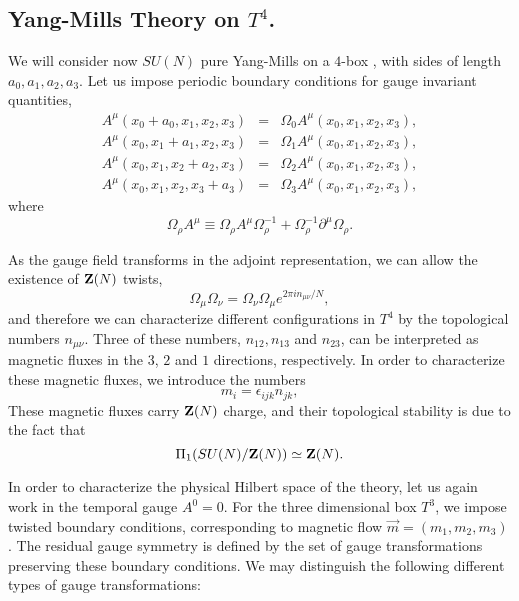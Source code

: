   
\subsection{Yang-Mills Theory on $T^4$.}

We will consider now $SU(N)$ pure Yang-Mills on a $4$-box \cite{tHtw}, with
sides of length $a_0,a_1,a_2,a_3$. Let us impose periodic boundary
conditions for gauge invariant quantities,
\begin{eqnarray}
A^{\mu} (x_0+a_0,x_1,x_2,x_3) & = & \Omega_0
A^{\mu}(x_0,x_1,x_2,x_3), \nonumber \\
A^{\mu} (x_0,x_1+a_1,x_2,x_3) & = & \Omega_1
A^{\mu}(x_0,x_1,x_2,x_3), \nonumber \\
A^{\mu} (x_0,x_1,x_2+a_2,x_3) & = & \Omega_2
A^{\mu}(x_0,x_1,x_2,x_3), \nonumber \\
A^{\mu} (x_0,x_1,x_2,x_3+a_3) & = & \Omega_3
A^{\mu}(x_0,x_1,x_2,x_3),
\label{eq:I60}
\end{eqnarray}
where 
\begin{equation}
\Omega_{\rho} A^{\mu} \equiv \Omega_{\rho} A^{\mu}
\Omega^{-1}_{\rho} + \Omega^{-1}_{\rho}
\partial ^{\mu} \Omega_{\rho}.
\label{eq:I61}
\end{equation}
  
As the gauge field transforms in the adjoint
representation, we can allow the existence of ${\bf Z}(N)$
twists,
\begin{equation}
\Omega_{\mu} \Omega_{\nu} = \Omega_{\nu} \Omega_{\mu} e^{2 \pi i
n_{\mu \nu}/N},
\label{eq:I62}
\end{equation}
and therefore we can characterize different configurations in
$T^4$ by the topological numbers $n_{\mu \nu}$. Three of
these numbers, $n_{12}, n_{13}$ and $n_{23}$, can be interpreted
as magnetic fluxes in the $3$, $2$ and $1$ directions,
respectively. In order to characterize these magnetic fluxes, we
introduce the numbers 
\begin{equation}
m_i = \epsilon_{ijk} n_{jk},
\label{eq:I63}
\end{equation}
These magnetic fluxes carry ${\bf Z}(N)$ charge, and their
topological stability is due to the fact that
\begin{equation}
\Pi_1(SU(N)/{\bf Z}(N)) \simeq {\bf Z}(N).
\label{eq:I64}
\end{equation}
  
In order to characterize the physical Hilbert space of the
theory, let us again work in the temporal gauge $A^0=0$. For the
three dimensional box $T^3$, we impose twisted boundary
conditions, corresponding to magnetic flow
$\vec{m}=(m_1,m_2,m_3)$. The residual gauge symmetry 
is defined by the set of gauge transformations preserving these
boundary conditions. We may distinguish the following different
types of gauge transformations:

